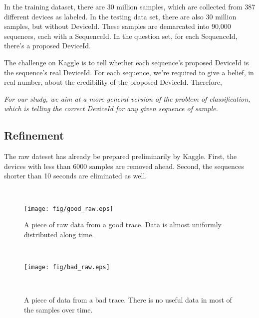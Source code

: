 \documentclass{article} %
\begin{document}
In the training dataset, there are 30 million samples, which are collected from 387 different devices as labeled. In the testing data set, there are also 30 million samples, but without DeviceId. These samples are demarcated into 90,000 sequences, each with a SequenceId. In the question set, for each SequenceId, there's a proposed DeviceId.

The challenge on Kaggle is to tell whether each sequence's proposed DeviceId is the sequence's real DeviceId. For each sequence, we're required to give a belief, in real number, about the credibility of the proposed DeviceId. Therefore, 

 \emph{For our study, we aim at a more general version of the problem of classification, which is telling the correct DeviceId for any given sequence of sample.}

\subsection{Refinement}
The raw dateset has already be prepared preliminarily by Kaggle. First, the devices with less than 6000 samples are removed ahead. Second, the sequences shorter than 10 seconds are eliminated as well. 

\begin{figure}
    \hspace{-0.5cm}
    \begin{minipage}[t]{0.02\textwidth}~
    \end{minipage}
    \begin{minipage}[t]{0.47\textwidth}
    \centering
    \texttt{[image: fig/good\_raw.eps]}
    \caption{A piece of raw data from a good trace. Data is almost uniformly distributed along time. }
    \label{fig:good_raw}
    \end{minipage}
    \begin{minipage}[t]{0.02\textwidth}~
    \end{minipage}
    \begin{minipage}[t]{0.47\textwidth}
    \centering
    \texttt{[image: fig/bad\_raw.eps]}\\
    \caption{A piece of data from a bad trace. There is no useful data in most of the samples over time. }
    \label{fig:bad_raw}
    \end{minipage}
    \begin{minipage}[t]{0.02\textwidth}~
    \end{minipage}%
 \end{figure}
\end{document}
